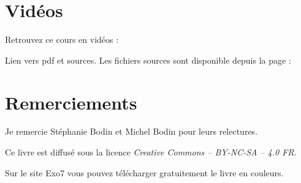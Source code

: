 

\clearemptydoublepage
\pagestyle{empty}\thispagestyle{empty}

\vspace*{\fill}

\section*{Vidéos}
Retrouvez ce cours en vidéos : 

Lien vers pdf et sources.
Les fichiers sources sont disponible depuis la page :

\section*{Remerciements}

Je remercie Stéphanie Bodin et Michel Bodin pour leurs relectures.



\vspace*{\fill}


\begin{center}
\end{center}


\begin{center}
Ce livre est diffusé sous la licence \emph{Creative Commons -- BY-NC-SA -- 4.0 FR}.

Sur le site Exo7 vous pouvez télécharger gratuitement le livre en couleurs.
\end{center}



\printindex

